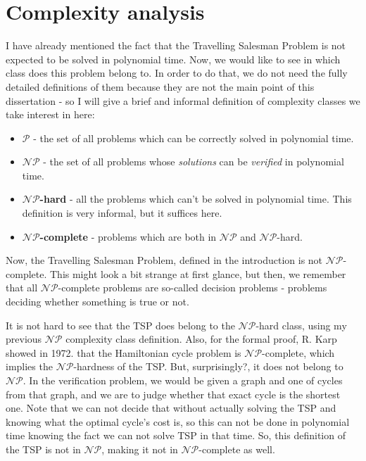 \documentclass[12pt,twoside,notitlepage]{report}
\begin{document}
\section{Complexity analysis}

I have already mentioned the fact that the Travelling Salesman Problem is not expected to be solved in polynomial time. Now, we would like to see in which class does this problem belong to. In order to do that, we do not need the fully detailed definitions of them because they are not the main point of this dissertation - so I will give a brief and informal definition of complexity classes we take interest in here:

\begin{itemize}

\item {\bf $\mathcal{P}$} - the set of all problems which can be correctly solved in polynomial time.
\item {\bf $\mathcal{NP}$} - the set of all problems whose {\it solutions} can be {\it verified} in polynomial time.
\item {\bf $\mathcal{NP}$-hard} - all the problems which can't be solved in polynomial time. This definition is very informal, but it suffices here. %
\item {\bf $\mathcal{NP}$-complete} - problems which are both in $\mathcal{NP}$ and $\mathcal{NP}$-hard.

\end{itemize}

Now, the Travelling Salesman Problem, defined in the introduction is not $\mathcal{NP}$-complete. This might look a bit strange at first glance, but then, we remember that all $\mathcal{NP}$-complete problems are so-called decision problems - problems deciding whether something is true or not.

\smallskip 

It is not hard to see that the TSP does belong to the $\mathcal{NP}$-hard class, using my previous $\mathcal{NP}$ complexity class definition. Also, for the formal proof, R. Karp showed in 1972.\cite{Karp_1972} that the Hamiltonian cycle problem is $\mathcal{NP}$-complete, which implies the $\mathcal{NP}$-hardness of the TSP. But, surprisingly?, it does not belong to $\mathcal{NP}$. In the verification problem, we would be given a graph and one of cycles from that graph, and we are to judge whether that exact cycle is the shortest one. Note that we can not decide that without actually solving the TSP and knowing what the optimal cycle's cost is, so this can not be done in polynomial time knowing the fact we can not solve TSP in that time. So, this definition of the TSP is not in $\mathcal{NP}$, making it not in $\mathcal{NP}$-complete as well.
\end{document}
